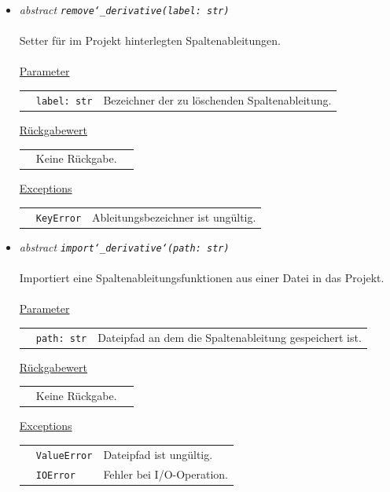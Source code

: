 \documentclass{article}
\begin{document}
\begin{itemize}
\item \textit{\flqq{}abstract\frqq} \texttt{\textit{remove\char`_derivative(label: str)}}\\\\
Setter für im Projekt hinterlegten Spaltenableitungen.
\\\\
\underline{Parameter}\\
\begin{tabular}{lll}
 & \texttt{label: str} & Bezeichner der zu löschenden Spaltenableitung.\\
\end{tabular}

\underline{Rückgabewert}\\
\begin{tabular}{lll}
 & Keine Rückgabe.\\
\end{tabular}

\underline{Exceptions}\\
\begin{tabular}{lll}
 & \texttt{KeyError} & Ableitungsbezeichner ist ungültig.\\
\end{tabular}


\item \textit{\flqq{}abstract\frqq} \texttt{\textit{import\char`_derivative\char`(path: str)}}\\\\
Importiert eine Spaltenableitungsfunktionen aus einer Datei in das Projekt.
\\\\
\underline{Parameter}\\
\begin{tabular}{lll}
 & \texttt{path: str} & Dateipfad an dem die Spaltenableitung gespeichert ist.\\
\end{tabular}

\underline{Rückgabewert}\\
\begin{tabular}{lll}
 & Keine Rückgabe.\\
\end{tabular}

\underline{Exceptions}\\
\begin{tabular}{lll}
 & \texttt{ValueError} & Dateipfad ist ungültig.\\
 & \texttt{IOError} & Fehler bei I/O-Operation.\\
\end{tabular}



\end{itemize}
\end{document}
